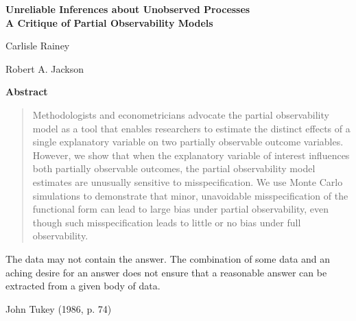\documentclass[10pt]{article}
\begin{document}
\begin{center}
{\LARGE \textbf{Unreliable Inferences about Unobserved Processes}\\\vspace{2mm}
{\large \textbf{A Critique of Partial Observability Models}}}

\vspace{10mm}

Carlisle Rainey

\vspace{3mm}

Robert A. Jackson
\end{center}

\vspace{10mm}

{\centerline{\textbf{Abstract}}}
\begin{quote}\noindent
Methodologists and econometricians advocate the partial observability model as a tool that enables researchers to estimate the distinct effects of a single explanatory variable on two partially observable outcome variables. 
However, we show that when the explanatory variable of interest influences both partially observable outcomes, the partial observability model estimates are unusually sensitive to misspecification. 
We use Monte Carlo simulations to demonstrate that minor, unavoidable misspecification of the functional form can lead to large bias under partial observability, even though such misspecification leads to little or no bias under full observability.
 \end{quote}
\vspace{10mm}
\epigraph{The data may not contain the answer. The combination of some data and an 
aching desire for an answer does not ensure that a reasonable answer can be extracted from a given body of data.}{John Tukey (1986, p. 74)}
\end{document}
